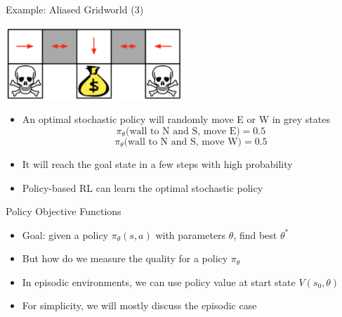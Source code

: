 \documentclass[aspectratio=169]{../latex_main/tntbeamer}  %
\begin{document}
\begin{frame}[c]{Example: Aliased Gridworld (3)}
	
	\begin{center}
		\includegraphics[width=0.5\textwidth]{images/gridworld3.png}
	\end{center}
	
	\begin{itemize}
		\item An optimal \alert{stochastic} policy will randomly move E or W in grey states
		$$\pi_\theta\text{(wall to N and S, move E)} = 0.5 $$
		$$\pi_\theta\text{(wall to N and S, move W)} = 0.5 $$
		\item It will reach the goal state in a few steps with high probability
		\item Policy-based RL can learn the optimal stochastic policy
	\end{itemize}
	
\end{frame}
\begin{frame}[c]{Policy Objective Functions}
	
	\begin{itemize}
		\item Goal: given a policy $\pi_\theta(s,a)$ with parameters $\theta$, find best $\theta^*$
		\item But how do we measure the quality for a policy $\pi_\theta$
		\item In episodic environments, we can use policy value at start state $V(s_0, \theta)$
		\item For simplicity, we will mostly discuss the episodic case
	\end{itemize}
	
\end{frame}
\end{document}

